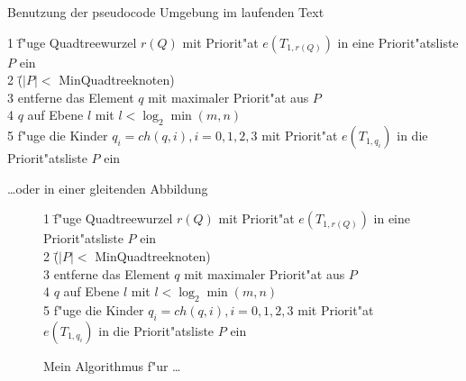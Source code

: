 \documentclass[german,11pt,a4paper]{article}
\begin{document}
Benutzung der pseudocode Umgebung im laufenden Text
\begin{pseudocode}[0.9\linewidth]
1 \=f"uge Quadtreewurzel $r(Q)$ mit Priorit"at $e(T_{1,r(Q)})$ in eine
Priorit"atsliste $P$ ein\\
2 \>\WHILE \=($|P| <$ MinQuadtreeknoten) \DO\\
3 \>\>entferne das Element $q$ mit maximaler Priorit"at aus $P$\\
4 \>\>\IF $q$ auf Ebene $l$ mit $l<\log_2\min(m,n)$\\
5 \>\>\THEN f"uge die Kinder $q_i=ch(q, i), i=0,1,2,3$ mit Priorit"at $e(T_{1,q_i})$ in die Priorit"atsliste $P$ ein
\end{pseudocode}

\ldots oder in einer gleitenden Abbildung
\begin{figure}[h]
\begin{fpseudocode}[0.9\linewidth]
1 \=f"uge Quadtreewurzel $r(Q)$ mit Priorit"at $e(T_{1,r(Q)})$ in eine
Priorit"atsliste $P$ ein\\
2 \>\WHILE \=($|P| <$ MinQuadtreeknoten) \DO\\
3 \>\>entferne das Element $q$ mit maximaler Priorit"at aus $P$\\
4 \>\>\IF $q$ auf Ebene $l$ mit $l<\log_2\min(m,n)$\\
5 \>\>\THEN f"uge die Kinder $q_i=ch(q, i), i=0,1,2,3$ mit Priorit"at $e(T_{1,q_i})$ in die Priorit"atsliste $P$ ein
\end{fpseudocode}
\caption{Mein Algorithmus f"ur \ldots}
\label{alg:MyAlgorithm}
\end{figure}
\end{document}
